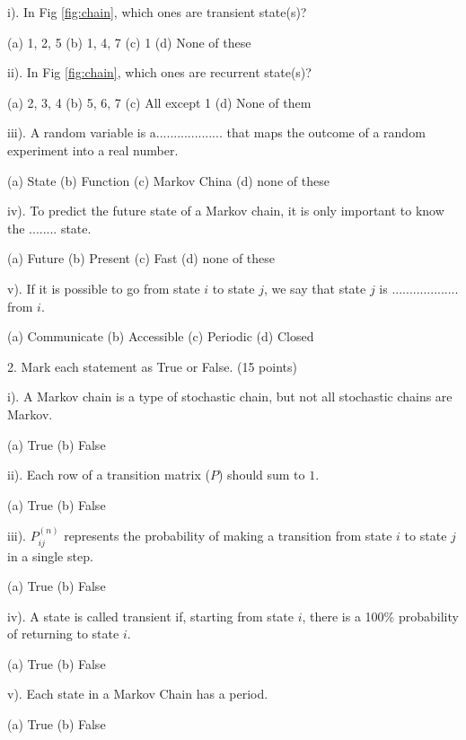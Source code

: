 \documentclass[6pt]{article}
\begin{document}
\vspace{10pt}

i). In Fig \ref{fig:chain},  which ones are transient state(s)?

(a)      1, 2, 5           (b)      1, 4, 7               (c)          1             (d)  None of these


ii). In Fig \ref{fig:chain},  which ones are recurrent state(s)?

(a)      2, 3, 4          (b)       5, 6, 7              (c)        All except 1            (d)  None of them

iii). A random variable is a................... that maps the outcome of a random experiment into a real number.

(a)   State      (b)     Function   (c)   Markov China    (d) none of these  

iv). To predict the future state of a Markov chain, it is only important to know the ........ state.

(a)   Future      (b)    Present   (c)   Fast    (d) none of these 

v). If it is possible to go from state $i$ to state $j$, we say that state  $j$ is ................... from $i$. 

(a)  Communicate     (b)  Accessible   (c) Periodic     (d) Closed

\vspace{10pt}

2. Mark each statement as True or False. (15 points)

\vspace{10pt}

i). A Markov chain is a type of stochastic chain, but not all stochastic chains are Markov.

(a) True   (b) False

ii). Each row of a transition matrix ($P$) should sum to $1$.

(a) True   (b) False  

iii). $P_{ij}^{(n)}$ represents the probability of making a transition from state $i$ to state $j$ in a single step.

(a) True   (b) False 

iv). A state is called transient if, starting from state $i$, there is a 100\% probability of returning to state $i$.

(a) True   (b) False 

v). Each state in a Markov Chain has a period. 

(a) True   (b) False 
\end{document}
